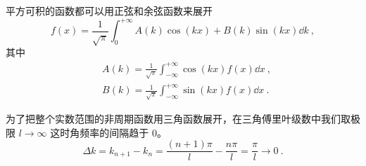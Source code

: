 
\begin{issues}
\issueDraft
\end{issues}

平方可积的函数都可以用正弦和余弦函数来展开
\begin{equation}
f(x) = \frac{1}{\sqrt{\pi}}\int_0^{+\infty} A(k) \cos(kx) + B(k)\sin(kx) \dd{k}~,
\end{equation}
其中
\begin{equation}
\begin{aligned}
&A(k) = \frac{1}{\sqrt{\pi}}\int_{-\infty}^{+\infty} \cos(kx) f(x) \dd{x}~,\\
&B(k) = \frac{1}{\sqrt{\pi}}\int_{-\infty}^{+\infty} \sin(kx) f(x) \dd{x}~.
\end{aligned}
\end{equation}

为了把整个实数范围的非周期函数用三角函数展开，在三角傅里叶级数中我们取极限 $l\to\infty$ 这时角频率的间隔趋于 0。
\begin{equation}
\Delta k = k_{n+1} - k_n = \frac{(n+1)\pi}{l} - \frac{n\pi}{l} = \frac{\pi}{l} \to 0~.
\end{equation}

